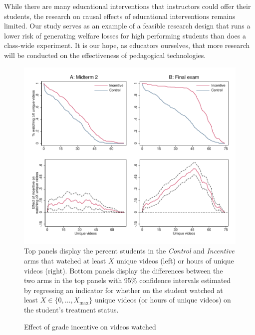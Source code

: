 \documentclass[12pt]{article}
\begin{document}
While there are many educational interventions that instructors could offer their students, the research on causal effects of educational interventions remains limited.
Our study serves as an example of a feasible research design that runs a lower risk of generating welfare losses for high performing students than does a class-wide experiment.
It is our hope, as educators ourselves, that more research will be conducted on the effectiveness of pedagogical technologies.

\printbibliography


\clearpage


\clearpage


\clearpage


\clearpage


\clearpage


\clearpage


\clearpage



\clearpage
\begin{figure}[t]
\begin{center}
\caption{Effect of grade incentive on videos watched}
\label{combo_cdf}
\includegraphics[width=1\textwidth, angle=0]{../plots/combo_cdf}
\footnotesize Top panels display the percent students in the \textit{Control}
 and \textit{Incentive} arms that watched at least $X$ unique videos (left) or hours of unique videos (right).
 Bottom panels display the differences between the two arms in the top panels with 95\% confidence intervals estimated by regressing an indicator for whether on the student watched at least $X\in\{0,\dots,X_{\max}\}$ unique videos (or hours of unique videos) on the student's treatment status.
\end{center}
\end{figure}
\end{document}
